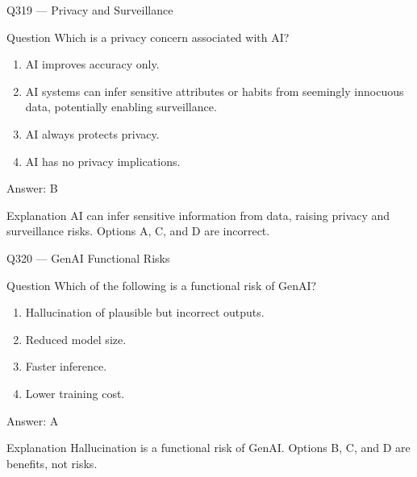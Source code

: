 \documentclass[aspectratio=169,8pt]{beamer}
\begin{document}
\begin{frame}{Q319 --- Privacy and Surveillance}
	\begin{block}{Question}
		Which is a privacy concern associated with AI?
		\begin{enumerate}
			\item AI improves accuracy only.
			\item AI systems can infer sensitive attributes or habits from seemingly innocuous data, potentially enabling surveillance.
			\item AI always protects privacy.
			\item AI has no privacy implications.
	\end{enumerate}  \end{block}
	\begin{exampleblock}{Answer: B}\end{exampleblock}
	\begin{block}{Explanation}
		AI can infer sensitive information from data, raising privacy and surveillance risks. Options A, C, and D are incorrect.
	\end{block}
\end{frame}

\begin{frame}{Q320 --- GenAI Functional Risks}
	\begin{block}{Question}
		Which of the following is a functional risk of GenAI?
		\begin{enumerate}
			\item Hallucination of plausible but incorrect outputs.
			\item Reduced model size.
			\item Faster inference.
			\item Lower training cost.
	\end{enumerate}  \end{block}
	\begin{exampleblock}{Answer: A}\end{exampleblock}
	\begin{block}{Explanation}
		Hallucination is a functional risk of GenAI. Options B, C, and D are benefits, not risks.
	\end{block}
\end{frame}

\end{document}
